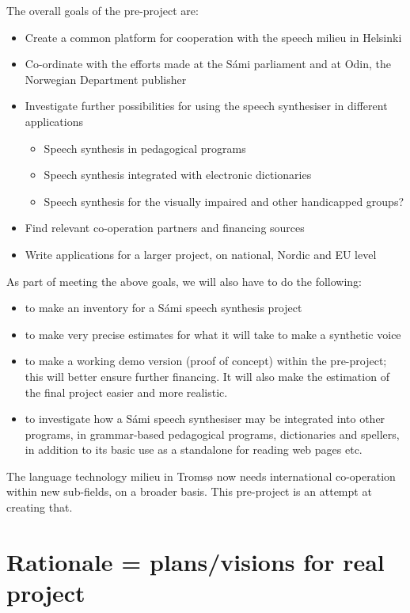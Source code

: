 \documentclass[a4paper,english]{article}
\begin{document}
The overall goals of the pre-project are: 

\begin{itemize}
\item Create a common platform for cooperation with the speech milieu in Helsinki
\item Co-ordinate with the efforts made at the Sámi parliament and at Odin, the  Norwegian Department publisher
\item Investigate further possibilities for using the speech synthesiser in different applications
 \begin{itemize}
  \item Speech synthesis in pedagogical programs
  \item Speech synthesis integrated with electronic dictionaries
  \item Speech synthesis for the visually impaired and other handicapped groups?
 \end{itemize}
\item Find relevant co-operation partners and financing sources
\item Write applications for a larger project, on national, Nordic and EU level 
\end{itemize}

As part of meeting the above goals, we will also have to do the following:

\begin{itemize}
\item to make an inventory for a Sámi speech synthesis project
\item to make very precise estimates for what it will take to make a synthetic voice
\item to make a working demo version (proof of concept) within the pre-project; this will better ensure further financing.  It will also make the estimation of the final project easier and more realistic.
\item to investigate how a Sámi speech synthesiser may be integrated into other programs, in grammar-based pedagogical programs, dictionaries and spellers, in addition to its basic use as a standalone for reading web pages etc.
\end{itemize}

The language technology milieu in Tromsø now needs international co-operation within new sub-fields, on a broader basis. This pre-project is an attempt at creating that.


\section{Rationale = plans/visions for real project}
\end{document}
